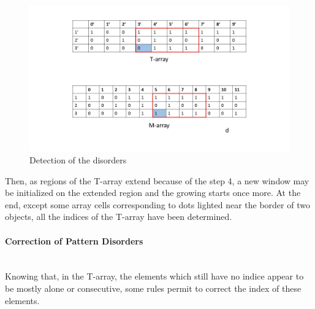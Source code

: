 \begin{figure}[h]
\begin{minipage}[b]{0.50\linewidth}
   \end{minipage}\hfill
   \begin{minipage}[b]{0.50\linewidth}   
      \centering \includegraphics[scale=0.3]{fig/detect4.jpg}
   \end{minipage}
	\caption{Detection of the disorders}
	\label{fig:detect}
\end{figure}


Then, as regions of the T-array extend because of the step 4, a new window may be initialized on the extended region and the growing starts once more. At the end, except some array cells corresponding to dots lighted near the border of two objects, all the indices of the T-array have been determined.










\paragraph*{Correction of Pattern Disorders}
~~\\
Knowing that, in the T-array, the elements which still have no indice appear to be mostly alone or consecutive, some rules permit to correct the index of these elements.

